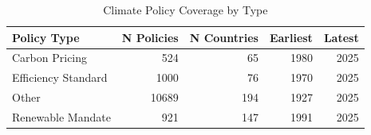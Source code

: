 \begin{table}
\caption{Climate Policy Coverage by Type}
\label{tab:policy_coverage}
\begin{tabular}{lrrrr}
\toprule
Policy Type & N Policies & N Countries & Earliest & Latest \\
\midrule
Carbon Pricing & 524 & 65 & 1980 & 2025 \\
Efficiency Standard & 1000 & 76 & 1970 & 2025 \\
Other & 10689 & 194 & 1927 & 2025 \\
Renewable Mandate & 921 & 147 & 1991 & 2025 \\
\bottomrule
\end{tabular}
\end{table}
